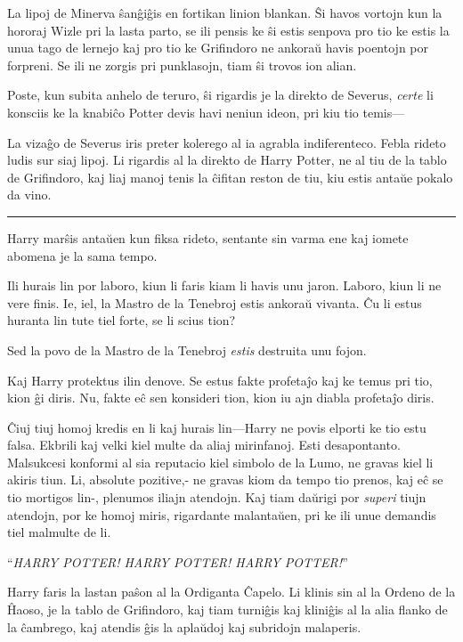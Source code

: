 La lipoj de Minerva ŝanĝiĝis en fortikan linion blankan. Ŝi havos
vortojn kun la hororaj Wizle pri la lasta parto, se ili pensis ke ŝi
estis senpova pro tio ke estis la unua tago de lernejo kaj pro tio ke
Grifindoro ne ankoraŭ havis poentojn por forpreni. Se ili ne zorgis
pri punklasojn, tiam ŝi trovos ion alian.

Poste, kun subita anhelo de teruro, ŝi rigardis je la direkto de
Severus, \emph{certe} li konsciis ke la knabiĉo Potter devis havi
neniun ideon, pri kiu tio temis—

La vizaĝo de Severus iris preter kolerego al ia agrabla
indiferenteco. Febla rideto ludis sur siaj lipoj. Li rigardis al la
direkto de Harry Potter, ne al tiu de la tablo de Grifindoro, kaj liaj
manoj tenis la ĉifitan reston de tiu, kiu estis antaŭe pokalo da vino.

\begin{center}\rule{3in}{0.4pt}\end{center}

Harry marŝis antaŭen kun fiksa rideto, sentante sin varma ene kaj
iomete abomena je la sama tempo.

Ili hurais lin por laboro, kiun li faris kiam li havis unu
jaron. Laboro, kiun li ne vere finis. Ie, iel, la Mastro de la
Tenebroj estis ankoraŭ vivanta. Ĉu li estus huranta lin tute tiel
forte, se li scius tion?

Sed la povo de la Mastro de la Tenebroj \emph{estis} destruita unu
fojon.

Kaj Harry protektus ilin denove. Se estus fakte profetaĵo kaj ke temus
pri tio, kion ĝi diris. Nu, fakte eĉ sen konsideri tion, kion iu ajn
diabla profetaĵo diris.

Ĉiuj tiuj homoj kredis en li kaj hurais lin—Harry ne povis elporti ke
tio estu falsa. Ekbrili kaj velki kiel multe da aliaj mirinfanoj. Esti
desapontanto. Malsukcesi konformi al sia reputacio kiel simbolo de la
Lumo, ne gravas kiel li akiris tiun. Li, absolute pozitive,- ne gravas
kiom da tempo tio prenos, kaj eĉ se tio mortigos lin-, plenumos iliajn
atendojn. Kaj tiam daŭrigi por \emph{superi} tiujn atendojn, por ke
homoj miris, rigardante malantaŭen, pri ke ili unue demandis
tiel malmulte de li.

``\emph{HARRY POTTER! HARRY POTTER! HARRY POTTER!}''

Harry faris la lastan paŝon al la Ordiganta Ĉapelo. Li klinis sin al
la Ordeno de la Ĥaoso, je la tablo de Grifindoro, kaj tiam turniĝis
kaj kliniĝis al la alia flanko de la ĉambrego, kaj atendis ĝis la
aplaŭdoj kaj subridojn malaperis.

